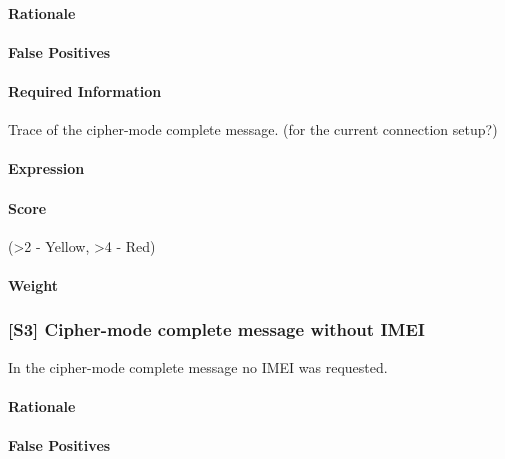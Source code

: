 \documentclass[a4paper,11pt,notitlepage,bigheadings,oneside]{scrartcl}
\begin{document}
\paragraph{Rationale}

\TBD

\paragraph{False Positives}

\TBD

\paragraph{Required Information}

Trace of the cipher-mode complete message. (for the current connection setup?)

\paragraph{Expression}

\TBD

\paragraph{Score}

\TBD{} (\textgreater 2 - Yellow, \textgreater 4 - Red)

\paragraph{Weight}

\TBD{}

\subsubsection{[S3] Cipher-mode complete message without IMEI}

In the cipher-mode complete message no IMEI was requested.

\paragraph{Rationale}

\TBD

\paragraph{False Positives}
\end{document}
